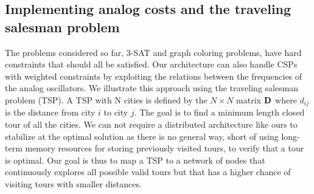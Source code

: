 \documentclass[10pt]{article}
\begin{document}
\subsection*{Implementing analog costs and the traveling salesman problem}
The problems considered so far, 3-SAT and graph coloring problems, have hard constraints that should all be satisfied. Our architecture can also handle CSPs with weighted constraints by exploiting the relations between the frequencies of the analog oscillators. We illustrate this approach using the traveling salesman problem (TSP). A TSP with N cities is defined by the $N \times N$ matrix ${\bf D}$ where $d_{ij}$ is the distance from city $i$ to city $j$. The goal is to find a minimum length closed tour of all the cities. We can not require a distributed architecture like ours to stabilize at the optimal solution as there is no general way, short of using long-term memory resources for storing previously visited tours, to verify that a tour is optimal. Our goal is thus to map a TSP to a network of nodes that continuously explores all possible valid tours but that has a higher chance of visiting tours with smaller distances. 
\end{document}
